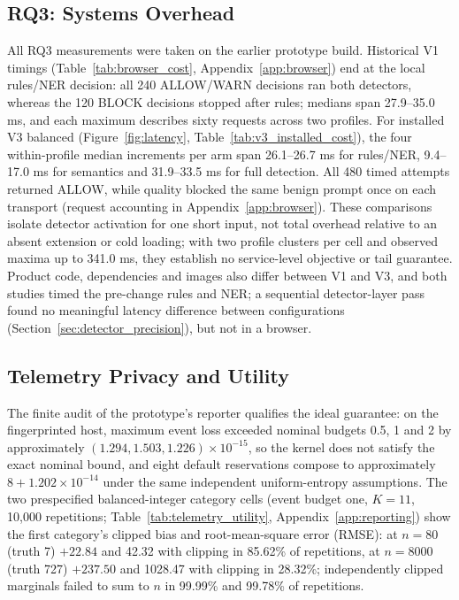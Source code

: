 \documentclass[sigconf]{acmart}
\theoremstyle{acmdefinition}\newtheorem{property}{Property}
\begin{document}
\subsection{RQ3: Systems Overhead}
All RQ3 measurements were taken on the earlier prototype build. Historical V1 timings (Table~\ref{tab:browser_cost}, Appendix~\ref{app:browser}) end at the local rules/NER decision: all 240 ALLOW/WARN decisions ran both detectors, whereas the 120 BLOCK decisions stopped after rules; medians span 27.9--35.0 ms, and each maximum describes sixty requests across two profiles. For installed V3 balanced (Figure~\ref{fig:latency}, Table~\ref{tab:v3_installed_cost}), the four within-profile median increments per arm span 26.1--26.7 ms for rules/NER, 9.4--17.0 ms for semantics and 31.9--33.5 ms for full detection. All 480 timed attempts returned ALLOW, while quality blocked the same benign prompt once on each transport (request accounting in Appendix~\ref{app:browser}). These comparisons isolate detector activation for one short input, not total overhead relative to an absent extension or cold loading; with two profile clusters per cell and observed maxima up to 341.0 ms, they establish no service-level objective or tail guarantee. Product code, dependencies and images also differ between V1 and V3, and both studies timed the pre-change rules and NER; a sequential detector-layer pass found no meaningful latency difference between configurations (Section~\ref{sec:detector_precision}), but not in a browser.

\subsection{Telemetry Privacy and Utility}
\label{sec:telemetry_results}
The finite audit of the prototype's reporter qualifies the ideal guarantee: on the fingerprinted host, maximum event loss exceeded nominal budgets 0.5, 1 and 2 by approximately $(1.294,1.503,1.226)\times10^{-15}$, so the kernel does not satisfy the exact nominal bound, and eight default reservations compose to approximately $8+1.202\times10^{-14}$ under the same independent uniform-entropy assumptions. The two prespecified balanced-integer category cells (event budget one, $K=11$, 10,000 repetitions; Table~\ref{tab:telemetry_utility}, Appendix~\ref{app:reporting}) show the first category's clipped bias and root-mean-square error (RMSE): at $n=80$ (truth 7) $+22.84$ and 42.32 with clipping in 85.62\% of repetitions, at $n=8000$ (truth 727) $+237.50$ and 1028.47 with clipping in 28.32\%; independently clipped marginals failed to sum to $n$ in 99.99\% and 99.78\% of repetitions.
\end{document}
